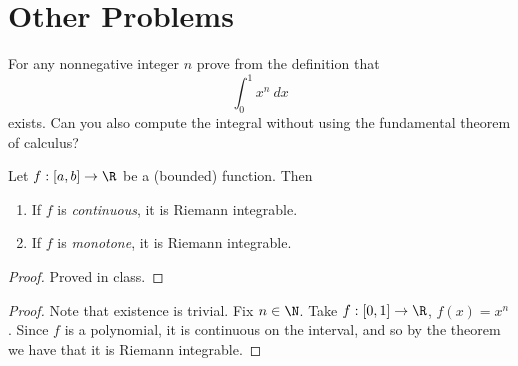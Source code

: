 \documentclass{assignment}
\begin{document}
\section*{Other Problems}
\begin{question}[1]
  For any nonnegative integer $n$ prove from the definition that 
$$\int_0^1 x^n\ dx$$ exists. Can you also compute the integral without using the fundamental theorem
of calculus?
\end{question}
\begin{theorem}
  Let $f: [a,b] \to \R$ be a (bounded) function. Then 
  \begin{enumerate}
    \item If $f$ is \emph{continuous}, it is Riemann integrable. 
    \item If $f$ is \emph{monotone}, it is Riemann integrable.
  \end{enumerate}
\end{theorem}
\begin{proof}
  Proved in class.
\end{proof}
\begin{proof}
  Note that existence is trivial. Fix $n \in\N$. Take $f: [0,1] \to \R$, $f(x) = x^n$. Since $f$ is
a polynomial, it is continuous on the interval, and so by the theorem we have that it is Riemann
integrable.
\end{proof}
\end{document}
